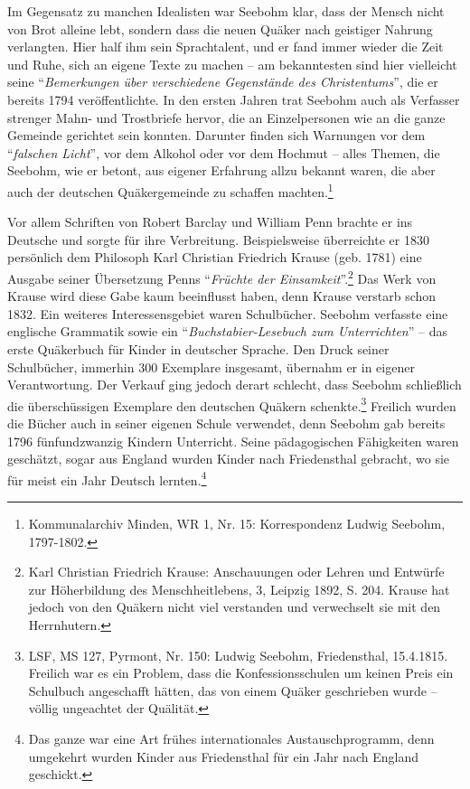 \medskip

Im Gegensatz zu manchen Idealisten war Seebohm klar, dass der Mensch nicht von
Brot alleine lebt, sondern dass die neuen Quäker nach geistiger Nahrung
verlangten. Hier half ihm sein Sprachtalent, und er fand immer wieder die Zeit
und Ruhe, sich an eigene Texte zu machen -- am bekanntesten sind hier vielleicht
seine "`\textit{Bemerkungen über verschiedene Gegenstände des Christentums}"',
die er bereits 1794 veröffentlichte. In den ersten Jahren trat Seebohm auch als
Verfasser strenger Mahn- und Trostbriefe hervor, die an Einzelpersonen wie an
die ganze Gemeinde gerichtet sein konnten. Darunter finden sich Warnungen vor
dem "`\textit{falschen Licht}"', vor dem Alkohol oder vor dem
Hochmut -- alles Themen, die Seebohm, wie er betont, aus eigener
Erfahrung allzu bekannt waren, die aber auch der deutschen Quäkergemeinde zu
schaffen machten.\footnote{Kommunalarchiv Minden, WR 1, Nr. 15: Korrespondenz
Ludwig Seebohm,
1797-1802.}

\medskip

Vor allem Schriften von Robert Barclay und
William Penn brachte er ins Deutsche und sorgte
für ihre Verbreitung. Beispielsweise überreichte er 1830 persönlich dem
Philosoph Karl Christian Friedrich Krause (geb. 1781) eine Ausgabe seiner Übersetzung Penns "`\textit{Früchte
der Einsamkeit}"'.\footnote{Karl Christian Friedrich Krause: Anschauungen oder
Lehren und Entwürfe zur
Höherbildung des Menschheitlebens, 3, Leipzig 1892, S. 204. Krause hat jedoch
von den Quäkern nicht viel verstanden und verwechselt sie mit den Herrnhutern.}
Das Werk von Krause wird diese Gabe kaum beeinflusst haben, denn Krause verstarb
schon 1832. Ein weiteres Interessensgebiet waren Schulbücher. Seebohm verfasste
eine englische Grammatik sowie ein "`\textit{Buchstabier-Lesebuch zum
Unterrichten}"' -- das erste Quäkerbuch für Kinder in
deutscher Sprache. Den Druck seiner Schulbücher, immerhin 300
Exemplare insgesamt, übernahm er in eigener Verantwortung. Der Verkauf ging
jedoch derart schlecht, dass Seebohm schließlich die überschüssigen Exemplare
den deutschen Quäkern schenkte.\footnote{LSF, MS 127, Pyrmont, Nr. 150: Ludwig
Seebohm, Friedensthal, 15.4.1815.
Freilich war es ein Problem, dass die Konfessionsschulen um keinen Preis ein
Schulbuch angeschafft hätten, das von einem Quäker geschrieben wurde -- völlig
ungeachtet der Quälität.} Freilich wurden die Bücher auch in seiner
eigenen Schule verwendet, denn Seebohm gab bereits 1796
fünfundzwanzig Kindern Unterricht. Seine pädagogischen Fähigkeiten waren
geschätzt, sogar aus England wurden Kinder nach
Friedensthal gebracht, wo sie für meist ein Jahr Deutsch lernten.\footnote{Das
ganze war eine Art frühes internationales Austauschprogramm, denn
umgekehrt wurden Kinder aus Friedensthal für ein Jahr nach England geschickt.}

